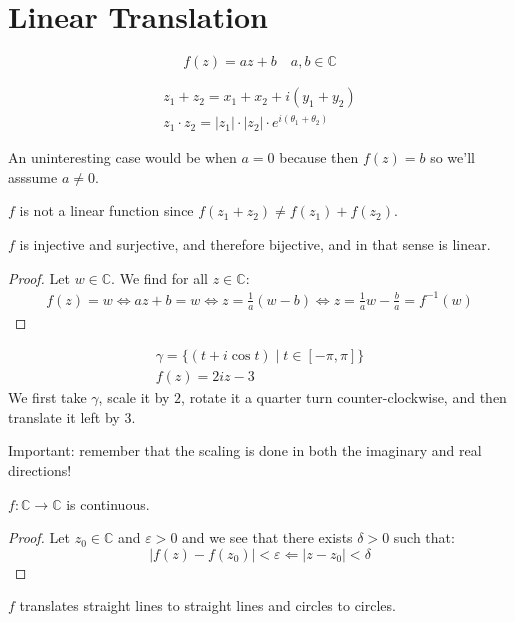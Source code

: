 \documentclass[00_complete]{subfiles}
\begin{document}
\section{Linear Translation}
$$ f(z) = az+b \quad a,b \in \mathbb{C} $$
\begin{reminder}
    \begin{gather*}
        z_1 + z_2 = x_1 + x_2 + i(y_1 + y_2) \\ 
        z_1 \cdot z_2  = |z_1|\cdot|z_2|\cdot e^{i(\theta_1+\theta_2)}
    \end{gather*}
\end{reminder}
An uninteresting case would be when $ a = 0 $ because then $ f(z)=b $ so we'll
asssume $ a \neq 0 $.

$ f $ is not a linear function since $ f(z_1 + z_2) \neq f(z_1) + f(z_2) $.
\begin{claim}
    $ f $ is injective and surjective, and therefore bijective, and in that
    sense is linear.
\end{claim}
\begin{proof}
    Let $ w \in \mathbb{C} $. We find for all $ z \in \mathbb{C} $:
    \begin{gather*}
        f(z)=w \iff a z+b=w \iff z= \frac{1}{a}(w-b) \iff
        z=\frac{1}{a}w-\frac{b}{a}= f^{-1}(w)
    \end{gather*}
\end{proof}
\begin{example}
    \begin{gather*}
        \gamma=\{(t+i\cos t) \mid t \in [-\pi, \pi]\} \\ 
        f(z) = 2iz-3
    \end{gather*}
    We first take $ \gamma $, scale it by $ 2 $, rotate it a quarter turn
    counter-clockwise, and then translate it left by $ 3 $.

    Important: remember that the scaling is done in both the imaginary and
    real directions!
\end{example}
\begin{claim}
    $ f: \mathbb{C} \to \mathbb{C}$ is continuous.
\end{claim}
\begin{proof}
    Let $ z_0 \in \mathbb{C} $ and $ \varepsilon > 0 $ and we see that there
    exists $ \delta > 0 $ such that:
    $$ |f(z) - f(z_0)| < \varepsilon \Leftarrow |z-z_0| <\delta $$
\end{proof}
\begin{claim}
    $ f $ translates straight lines to straight lines and circles to circles.
\end{claim}
\end{document}
